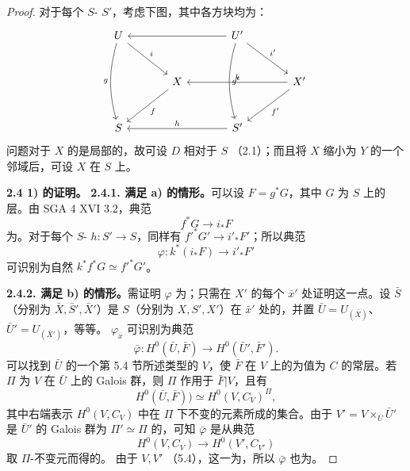 \begin{proof}
对于每个 $S$- $S'$，考虑下图，其中各方块均为：
\[
\begin{tikzcd}[column sep=large,row sep=large]
U\arrow[dr,"i"]\arrow[dd,"g"',bend right=15]&&U'\arrow[ll]\arrow[dr,"i'"]\arrow[dd,"g'",bend right=15]&\\
&X\arrow[dl,"f"]&&X'\arrow[ll,"k"']\arrow[dl,"f'"]\\
S&&S'\arrow[ll,"h"']&
\end{tikzcd}
\]
问题对于 $X$ 的是局部的，故可设 $D$ 相对于 $S$ （2.1）；而且将 $X$ 缩小为 $Y$ 的一个邻域后，可设 $X$ 在 $S$ 上。

\textbf{2.4 1) 的证明。}
\textbf{2.4.1. 满足 a) 的情形。}可以设 $F=g^*G$，其中 $G$ 为 $S$ 上的层。由 SGA 4 XVI 3.2，典范
\[f^*G\longrightarrow i_*F\tag{2.4.1.1}\]
为。对于每个 $S$- $h:S'\to S$，同样有 $f'^*G'\to i'_*F'$；所以典范
\[\varphi:k^*(i_*F)\longrightarrow i'_*F'\]
可识别为自然 $k^*f^*G\simeq f'^*G'$。

\textbf{2.4.2. 满足 b) 的情形。}需证明 $\varphi$ 为；只需在 $X'$ 的每个 $\bar x'$ 处证明这一点。设 $\bar S$（分别为 $\bar X,\bar S',\bar X'$）是 $S$（分别为 $X,S',X'$）在 $\bar x'$ 处的，并置 $\bar U=U_{(\bar X)}$、$\bar U'=U_{(\bar X')}$，等等。 $\varphi_{\bar x}$ 可识别为典范
\[\bar\varphi:H^0(\bar U,\bar F)\longrightarrow H^0(\bar U',\bar F').\]
可以找到 $\bar U$ 的一个第 5.4 节所述类型的 $V$，使 $\bar F$ 在 $V$ 上的为值为 $C$ 的常层。若 $\Pi$ 为 $V$ 在 $\bar U$ 上的 Galois 群，则 $\Pi$ 作用于 $\bar F|V$，且有
\[H^0(\bar U,\bar F))\simeq H^0(V,C_V)^\Pi,\tag{2.4.2.1}\]
其中右端表示 $H^0(V,C_V)$ 中在 $\Pi$ 下不变的元素所成的集合。由于 $V'=V\times_{\bar U}\bar U'$ 是 $\bar U'$ 的 Galois 群为 $\Pi'\simeq\Pi$ 的，可知 $\bar\varphi$ 是从典范
\[H^0(V,C_V)\longrightarrow H^0(V',C_{V'})\]
取 $\Pi$-不变元而得的。
由于 $V,V'$ （5.4），这一为，所以 $\bar\varphi$ 也为。


\end{proof}

